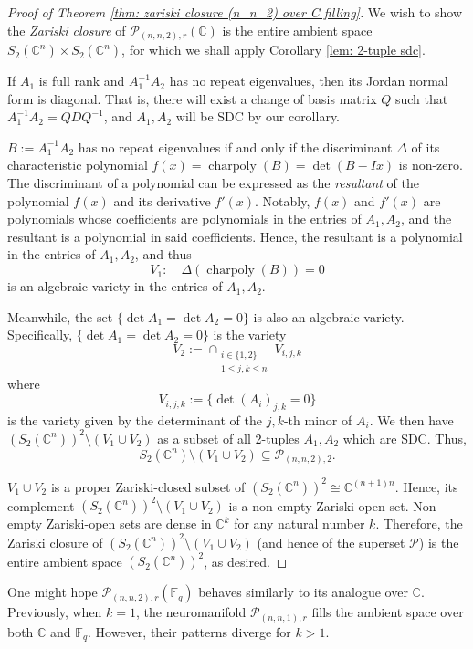 \documentclass[a4paper]{cas-sc}
\newcommand{\F}{\mathbb{F}}
\newcommand{\C}{\mathbb{C}}     %
\begin{document}
    \begin{proof} [Proof of Theorem \ref{thm: zariski closure (n_n_2) over C filling}]
        We wish to show the \textit{Zariski closure} of $\mathcal{P}_{(n,n,2),r}(\C)$ is the entire ambient space $S_2(\mathbb{C}^n)\times S_2(\mathbb{C}^n)$, for which we shall apply Corollary \ref{lem: 2-tuple sdc}.

        If $A_1$ is full rank and $A_1^{-1}A_2$ has no repeat eigenvalues, then its Jordan normal form is diagonal. That is, there will exist a change of basis matrix $Q$ such that $A_1^{-1}A_2 = QDQ^{-1}$, and $A_1,A_2$ will be SDC by our corollary. 

        $B:= A_1^{-1}A_2 $ has no repeat eigenvalues if and only if the discriminant $\Delta$ of its characteristic polynomial $f(x) = \operatorname{charpoly}(B) = \det(B-Ix)$ is non-zero. The discriminant of a polynomial can be expressed as the \textit{resultant} of the polynomial $f(x)$ and its derivative $f'(x)$. Notably, $f(x)$ and $f'(x)$ are polynomials whose coefficients are polynomials in the entries of $A_1, A_2$, and the resultant is a polynomial in said coefficients. Hence, the resultant is a polynomial in the entries of $A_1, A_2$, and thus 
        $$V_1: \quad \Delta (\operatorname{charpoly}(B)) = 0$$
        is an algebraic variety in the entries of $A_1, A_2$. 

        Meanwhile, the set $ \{\det A_1 = \det A_2 = 0\}$ is also an algebraic variety. Specifically, $\{\det A_1 = \det A_2 = 0\}$ is the variety $$V_2 := \cap_{\substack{i \in \{1,2\} \\ 1 \leq j,k \leq n}} V_{i,j,k}$$ where $$V_{i,j,k} := \{\det (A_i)_{j,k} = 0\}$$ is the variety given by the determinant of the $j,k$-th minor of $A_i$. We then have $\left(S_2(\mathbb{C}^n)\right)^2 \setminus (V_1 \cup V_2)$ as a subset of all 2-tuples $A_1,A_2$ which are SDC. Thus,
        \[
            S_2(\mathbb{C}^n) \setminus (V_1 \cup V_2) \subseteq \mathcal{P}_{(n,n,2),2}.
        \]
        
        $V_1 \cup V_2$ is a proper Zariski-closed subset of $\left(S_2(\mathbb{C}^n)\right)^2 \cong \mathbb{C}^{(n+1)n}$. Hence, its complement $\left(S_2(\mathbb{C}^n)\right)^2 \setminus (V_1 \cup V_2)$ is a non-empty Zariski-open set. Non-empty Zariski-open sets are dense in $\mathbb{C}^k$ for any natural number $k$. Therefore, the Zariski closure of $\left(S_2(\mathbb{C}^n)\right)^2 \setminus (V_1 \cup V_2)$ (and hence of the superset $\mathcal{P}$) is the entire ambient space $\left(S_2(\mathbb{C}^n)\right)^2$, as desired.
    \end{proof}
    One might hope $\mathcal{P}_{(n,n,2),r}(\mathbb{F}_q)$ behaves similarly to its analogue over $\mathbb{C}$. Previously, when $k = 1$, the neuromanifold $\mathcal{P}_{(n,n,1),r}$ fills the ambient space over both $\mathbb{C}$ and $\F_q$. However, their patterns diverge for $k> 1$.
\end{document}
